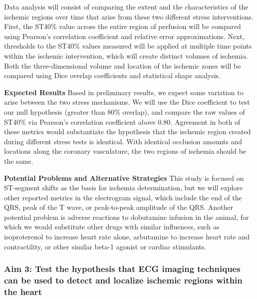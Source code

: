 Data analysis will consist of comparing the extent and the characteristics
of the ischemic regions over time that arise from these two different
stress interventions. First, the ST40\% value across the entire region of
perfusion will be compared using Pearson's correlation coefficient and
relative error approximations. Next, thresholds to the ST40\% values
measured will be applied at multiple time points within the ischemic
intervention, which will create distinct volumes of ischemia. Both the
three-dimensional volume and location of the ischemic zones will be
compared using Dice overlap coefficients and statistical shape analysis.

\textbf{Expected Results} Based in preliminary results, we expect some
variation to arise between the two stress mechanisms.  We will use the Dice
coefficient to test our null hypothesis (greater than 80\% overlap), and
compare the raw values of ST40\% via Pearson's correlation
coefficient above 0.80. Agreement in both of these metrics would
substantiate the hypothesis that the ischemic region created during
different stress tests is identical. With identical occlusion amounts and
locations along the coronary vasculature, the two regions of ischemia
should be the same.





\textbf{Potential Problems and Alternative Strategies} This study is
focused on ST-segment shifts as the basis for ischemia determination, but
we will explore other reported metrics in the electrogram signal, which
include the end of the QRS, peak of the T wave, or peak-to-peak amplitude
of the QRS. Another potential problem is adverse reactions to dobutamine
infusion in the animal, for which we would substitute other drugs with
similar influences, such as isoproterenol to increase heart rate alone,
arbutamine to increase heart rate and contractility, or other similar
beta-1 agonist or cardiac stimulants.

\subsubsection{Aim 3: Test the hypothesis that ECG imaging techniques can be used to detect and localize ischemic regions within the heart}

